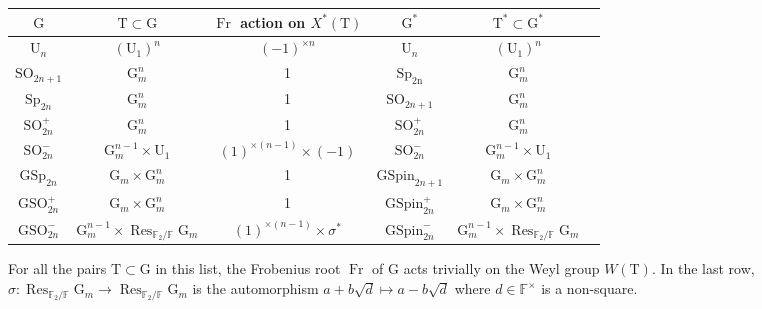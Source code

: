 \documentclass[12pt, reqno]{amsart}
\theoremstyle{definition}
\theoremstyle{definition}
\theoremstyle{definition}
\newcommand{\multiplicativegroup}[1]{#1^{\times}}
\newcommand{\SO}{\mathrm{SO}}
\newcommand{\GSO}{\mathrm{GSO}}
\newcommand{\Sp}{\mathrm{Sp}}
\newcommand{\GSp}{\mathrm{GSp}}
\newcommand{\UnitaryGroup}{\mathrm{U}}
\newcommand{\finiteField}{\mathbb{F}}
\newcommand{\finiteFieldExtension}[1]{\finiteField_{#1}}
\newcommand{\Frobenius}{\operatorname{Fr}}
\newcommand{\restrictionOfScalars}[3]{\operatorname{Res}_{#1 \slash #2}{#3}}
\newcommand{\multiplcativeScheme}{\algebraicGroup{G}_m}
\newcommand{\algebraicGroup}[1]{\boldsymbol{\mathrm{#1}}}
\newcommand{\CharacterLattice}[1]{X^{\ast}\left(#1\right)}
\begin{document}
\begin{center}
	\begin{tabular}{|c|c|c|c|c|c|} \hline
		$\algebraicGroup{G}$ & $\algebraicGroup{T} \subset \algebraicGroup{G}$ & $\Frobenius$ action on $\CharacterLattice{\algebraicGroup{T}}$ & $\algebraicGroup{G}^{\ast}$ & $\algebraicGroup{T}^{\ast} \subset \algebraicGroup{G}^{\ast}$ \tabularnewline \hline \hline
		$\algebraicGroup{\UnitaryGroup}_n$ & $(\algebraicGroup{\UnitaryGroup}_1)^{n}$ & $\left(-1\right)^{\times n}$ & $\algebraicGroup{\UnitaryGroup}_n$ &  $(\algebraicGroup{\UnitaryGroup}_1)^{n}$ \tabularnewline \hline		 
		$\algebraicGroup{\SO}_{2n+1}$ & $\multiplcativeScheme^n$ & 1 &$\algebraicGroup{\Sp_{2n}}$ &  $\multiplcativeScheme^n$ \tabularnewline \hline
		$\algebraicGroup{\Sp}_{2n}$ & $\multiplcativeScheme^n$ & 1 &$\algebraicGroup{\SO}_{2n+1}$ & $\multiplcativeScheme^n$ \tabularnewline \hline		 
		$\algebraicGroup{\SO}^{+}_{2n}$ & $\multiplcativeScheme^n$ & 1 &$\algebraicGroup{\SO}^{+}_{2n}$ &  $\multiplcativeScheme^n$ \tabularnewline \hline
		$\algebraicGroup{\SO}^{-}_{2n}$ & $\multiplcativeScheme^{n-1} \times \algebraicGroup{\UnitaryGroup}_1$ & $\left(1\right)^{\times {\left(n-1\right)}} \times \left(-1\right)$ &$\algebraicGroup{\SO}^{-}_{2n}$ &  $\multiplcativeScheme^{n-1} \times \algebraicGroup{\UnitaryGroup}_1$ \tabularnewline \hline
		$\algebraicGroup{\GSp}_{2n}$ & $\multiplcativeScheme \times \multiplcativeScheme^{n}$ & 1 &$\algebraicGroup{GSpin}_{2n+1}$ &  $\multiplcativeScheme \times \multiplcativeScheme^{n}$ \tabularnewline \hline
		$\algebraicGroup{\GSO}^{+}_{2n}$ & $\multiplcativeScheme \times \multiplcativeScheme^{n}$ & 1 & $\algebraicGroup{GSpin}_{2n}^{+}$ &  $\multiplcativeScheme \times \multiplcativeScheme^{n}$ \tabularnewline \hline
		$\algebraicGroup{\GSO}^{-}_{2n}$ & $\multiplcativeScheme^{n-1} \times \restrictionOfScalars{\finiteFieldExtension{2}}{\finiteField}{\multiplcativeScheme}$ & $\left(1\right)^{\times {\left(n-1\right)}} \times \sigma^{\ast}$ & $\algebraicGroup{GSpin}_{2n}^{-}$ &  $\multiplcativeScheme^{n-1} \times \restrictionOfScalars{\finiteFieldExtension{2}}{\finiteField}{\multiplcativeScheme}$ \tabularnewline \hline
	\end{tabular}
\end{center}
For all the pairs $\algebraicGroup{T} \subset \algebraicGroup{G}$ in this list, the Frobenius root $\Frobenius$ of $\algebraicGroup{G}$ acts trivially on the Weyl group $W\left(\algebraicGroup{T}\right)$. In the last row, $\sigma \colon \restrictionOfScalars{\finiteFieldExtension{2}}{\finiteField}{\multiplcativeScheme} \to \restrictionOfScalars{\finiteFieldExtension{2}}{\finiteField}{\multiplcativeScheme}$ is the automorphism $a + b\sqrt{d} \mapsto a - b\sqrt{d}$ where $d \in \multiplicativegroup{\finiteField}$ is a non-square.
\end{document}
